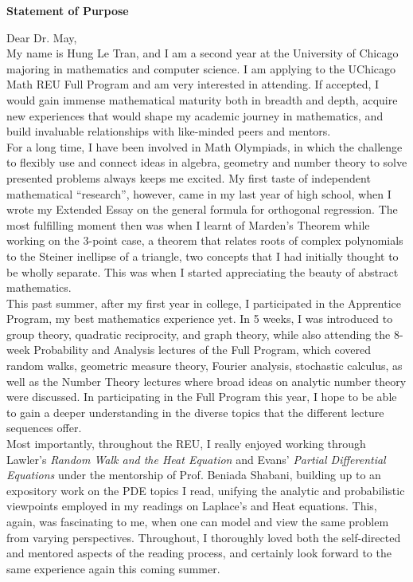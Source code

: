 \documentclass[a4paper, 11pt]{extarticle}
\begin{document}
\pagestyle{empty}
\begin{center}
    \textbf{\Large{Statement of Purpose}}
\end{center}

Dear Dr. May,\\

My name is Hung Le Tran, and I am a second year at the University of Chicago majoring in mathematics and computer science. I am applying to the UChicago Math REU Full Program and am very interested in attending. If accepted, I would gain immense mathematical maturity both in breadth and depth, acquire new experiences that would shape my academic journey in mathematics, and build invaluable relationships with like-minded peers and mentors.\\

For a long time, I have been involved in Math Olympiads, in which the challenge to flexibly use and connect ideas in algebra, geometry and number theory to solve presented problems always keeps me excited. My first taste of independent mathematical “research”, however, came in my last year of high school, when I wrote my Extended Essay on the general formula for orthogonal regression. The most fulfilling moment then was when I learnt of Marden's Theorem while working on the 3-point case, a theorem that relates roots of complex polynomials to the Steiner inellipse of a triangle, two concepts that I had initially thought to be wholly separate. This was when I started appreciating the beauty of abstract mathematics.\\

This past summer, after my first year in college, I participated in the Apprentice Program, my best mathematics experience yet. In 5 weeks, I was introduced to group theory, quadratic reciprocity, and graph theory, while also attending the 8-week Probability and Analysis lectures of the Full Program, which covered random walks, geometric measure theory, Fourier analysis, stochastic calculus, as well as the Number Theory lectures where broad ideas on analytic number theory were discussed. In participating in the Full Program this year, I hope to be able to gain a deeper understanding in the diverse topics that the different lecture sequences offer.\\

Most importantly, throughout the REU, I really enjoyed working through Lawler's \textit{Random Walk and the Heat Equation} and Evans' \textit{Partial Differential Equations} under the mentorship of Prof. Beniada Shabani, building up to an expository work on the PDE topics I read, unifying the analytic and probabilistic viewpoints employed in my readings on Laplace's and Heat equations. This, again, was fascinating to me, when one can model and view the same problem from varying perspectives. Throughout, I thoroughly loved both the self-directed and mentored aspects of the reading process, and certainly look forward to the same experience again this coming summer.\\
\end{document}

